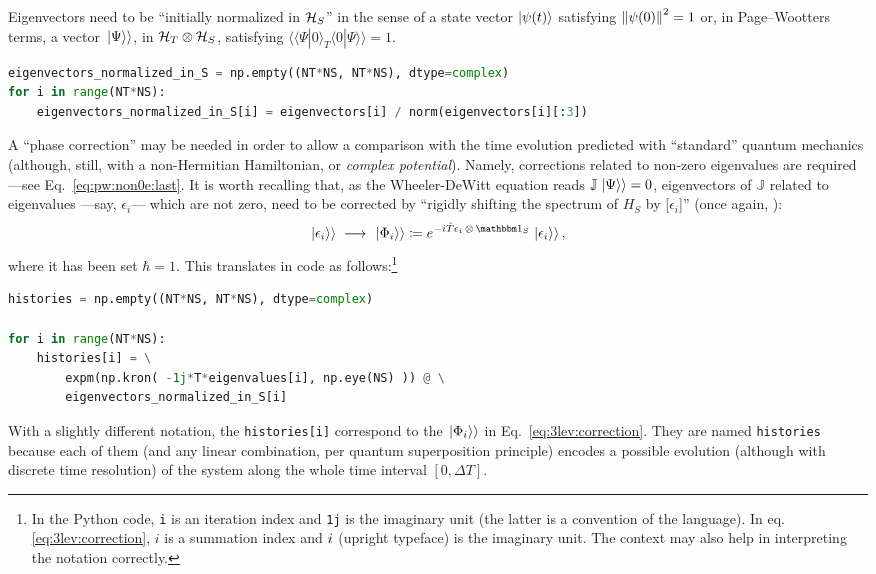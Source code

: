 Eigenvectors need to be ``initially normalized in $\mathcal{H}_S$'' in the sense
of a state vector $\ket{\psi(t)}$ satisfying
$\norm{\psi(0)}^2=1$ or,
 in Page--Wootters terms,
 a vector $\left.\left| \Psi \right\rangle\right\rangle$, in $\mathcal{H}_T \otimes \mathcal{H}_S$, satisfying
 $\langle\langle \Psi | 0 \rangle_{T}\langle 0 | \Psi \rangle \rangle = 1$.
\begin{lstlisting}[language=Python]
eigenvectors_normalized_in_S = np.empty((NT*NS, NT*NS), dtype=complex)
for i in range(NT*NS):
    eigenvectors_normalized_in_S[i] = eigenvectors[i] / norm(eigenvectors[i][:3])
\end{lstlisting}

A ``phase correction'' may be needed in order to allow a comparison with
the time evolution predicted with ``standard'' quantum mechanics
(although, still, with a non-Hermitian Hamiltonian, or \emph{complex potential}).
Namely,
corrections related to non-zero eigenvalues are required ---see Eq.~\eqref{eq:pw:non0e:last}.
It is worth recalling that,
as the Wheeler-DeWitt equation reads $\mathbb{J} \left.\left| \Psi \right\rangle\right\rangle = 0$,
eigenvectors of $\mathbb{J}$ related to eigenvalues ---say, $\epsilon_{i}$---
which are not zero,
need to be corrected by ``rigidly shifting the spectrum of $H_{S}$
by [$\epsilon_{i}$]'' (once again, \cite[``\textit{The Zero-eigenvalue}'']{Lloyd:Time}):
\begin{equation}
  \dket{\epsilon_i} \;\longrightarrow\; \dket{\Phi_{i}} \eqbydef e^{ -\iu \op{T} \epsilon_{i} \, \ox \, \idop_{S}} \dket{\epsilon_{i}} \text{,}
  \label{eq:3lev:correction}
\end{equation}
where it has been set $\hbar=1$. This translates in code as follows:\footnote{
  In the Python code, \Verb+i+ is an iteration index and \Verb|1j| is the imaginary unit
  (the latter is a convention of the language).
  In eq.\eqref{eq:3lev:correction},
  $i$ is a summation index and $i$ (upright typeface) is the imaginary unit.
  The context may also help in interpreting the notation correctly.
}
\begin{lstlisting}[language=Python]
histories = np.empty((NT*NS, NT*NS), dtype=complex)

for i in range(NT*NS):
    histories[i] = \
        expm(np.kron( -1j*T*eigenvalues[i], np.eye(NS) )) @ \
        eigenvectors_normalized_in_S[i]
\end{lstlisting}
%
With a slightly different notation,
the \Verb|histories[i]|
correspond to the $\left.\left| \Phi_i \right\rangle\right\rangle$ in Eq.~\eqref{eq:3lev:correction}.
They are named \Verb!histories! because each of them
(and any linear combination, per quantum superposition principle)
encodes a possible evolution (although with discrete time resolution)
of the system along the whole time interval $[0, \Delta T]$.

